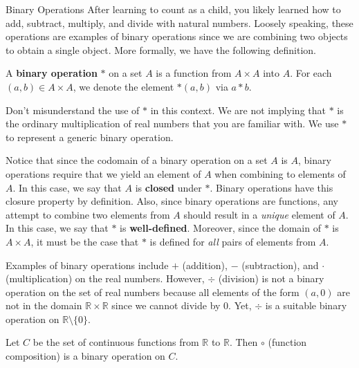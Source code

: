 \begin{section}{Binary Operations}
After learning to count as a child, you likely learned how to add, subtract, multiply, and divide with natural numbers.  Loosely speaking, these operations are examples of binary operations since we are combining two objects to obtain a single object.  More formally, we have the following definition.

\begin{definition}
A \textbf{binary operation} $*$ on a set $A$ is a function from $A\times A$ into $A$.  For each $(a,b)\in A\times A$, we denote the element $*(a,b)$ via $a*b$.
\end{definition}

\begin{remark}
Don't misunderstand the use of $*$ in this context.  We are not implying that $*$ is the ordinary multiplication of real numbers that you are familiar with.  We use $*$ to represent a generic binary operation.  
\end{remark}

\begin{remark}
Notice that since the codomain of a binary operation on a set $A$ is $A$, binary operations require that we yield an element of $A$ when combining to elements of $A$.  In this case, we say that $A$ is \textbf{closed} under $*$.  Binary operations have this closure property by definition.  Also, since binary operations are functions, any attempt to combine two elements from $A$ should result in a \emph{unique} element of $A$.  In this case, we say that $*$ is \textbf{well-defined}.  Moreover, since the domain of $*$ is $A\times A$, it must be the case that $*$ is defined for \emph{all} pairs of elements from $A$.
\end{remark}

\begin{example}
Examples of binary operations include $+$ (addition), $-$ (subtraction), and $\cdot$ (multiplication) on the real numbers.  However, $\div$ (division) is not a binary operation on the set of real numbers because all elements of the form $(a,0)$ are not in the domain $\mathbb{R}\times \mathbb{R}$ since we cannot divide by 0.  Yet, $\div$ is a suitable binary operation on $\mathbb{R}\setminus \{0\}$.
\end{example}

\begin{example}
Let $C$ be the set of continuous functions from $\mathbb{R}$ to $\mathbb{R}$.  Then $\circ$ (function composition) is a binary operation on $C$.
\end{example}


\end{section}
